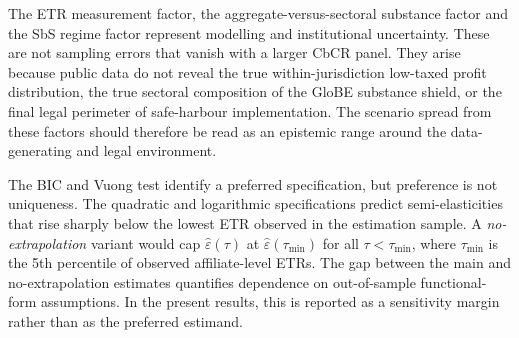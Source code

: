 \documentclass[11pt,a4paper]{article}
\begin{document}
The ETR measurement factor, the aggregate-versus-sectoral substance factor and the SbS regime factor represent modelling and institutional uncertainty. These are not sampling errors that vanish with a larger CbCR panel. They arise because public data do not reveal the true within-jurisdiction low-taxed profit distribution, the true sectoral composition of the GloBE substance shield, or the final legal perimeter of safe-harbour implementation. The scenario spread from these factors should therefore be read as an epistemic range around the data-generating and legal environment.

The BIC and Vuong test identify a preferred specification, but preference is not uniqueness. The quadratic and logarithmic specifications predict semi-elasticities that rise sharply below the lowest ETR observed in the estimation sample. A \emph{no-extrapolation} variant would cap $\hat{\varepsilon}(\tau)$ at $\hat{\varepsilon}(\tau_{\min})$ for all $\tau < \tau_{\min}$, where $\tau_{\min}$ is the 5th percentile of observed affiliate-level ETRs. The gap between the main and no-extrapolation estimates quantifies dependence on out-of-sample functional-form assumptions. In the present results, this is reported as a sensitivity margin rather than as the preferred estimand.
\end{document}
